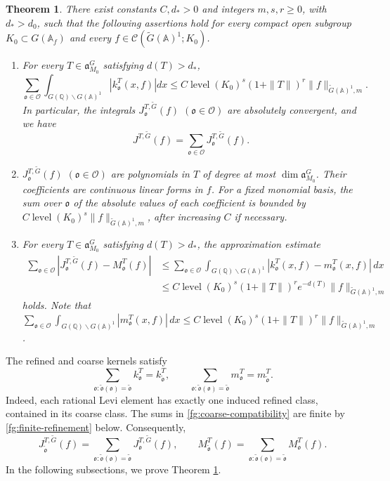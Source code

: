 \documentclass[12pt]{amsart}
\theoremstyle{definition}
\theoremstyle{plain}
\newtheorem{theorem}[definition]{Theorem}
\theoremstyle{remark}
\def\Q{\mathbb{Q}}%
\def\A{\mathbb{A}}%
\def\bs{\backslash}%
\newcommand{\fa}{\mathfrak{a}}
\newcommand{\fo}{\mathfrak{o}}
\newcommand{\cC}{\mathcal{C}}
\newcommand{\cO}{\mathcal{O}}
\numberwithin{equation}{section}
\newcommand{\tG}{\widetilde{G}}
\newcommand{\tfo}{\widetilde{\mathfrak{o}}}
\newcommand{\level}{\operatorname{level}}
\begin{document}
\begin{theorem}\label{thm:main theorem 2}
There exist constants $C,d_*>0$ and integers $m,s,r\ge0$,
with $d_*>d_0$, such that the following assertions hold for
every compact open subgroup $K_0\subset G(\A_f)$ and every
$f\in\cC(\tG(\A)^1;K_0)$.
\begin{enumerate}[(1)]
\item For every $T\in\fa_{M_0}^G$ satisfying $d(T)>d_*$,
\begin{equation*}
 \sum_{\fo\in\cO}\int_{G(\Q)\bs G(\A)^1}
     |k_\fo^T(x,f)|dx
 \le C\level(K_0)^s
          (1+\|T\|)^r\|f\|_{\tG(\A)^1,m}.
\end{equation*}
In particular, the integrals $J_\fo^{T,\tG}(f)$ $(\fo\in\cO)$ are absolutely convergent, and we have
\[
 J^{T,\tG}(f)=\sum_{\fo\in\cO}J_\fo^{T,\tG}(f).
\]
\item $J_\fo^{T,\tG}(f)$ $(\fo\in\cO)$ are polynomials
in $T$ of degree at most $\dim\fa_{M_0}^G$.
Their coefficients are continuous linear forms in $f$.
For a fixed monomial basis, the sum over $\fo$ of the absolute
values of each coefficient is bounded by
$C\level(K_0)^s\|f\|_{\tG(\A)^1,m}$,
after increasing $C$ if necessary.
\item For every $T\in\fa_{M_0}^G$ satisfying $d(T)>d_*$, the approximation estimate
\begin{align*}
 \sum_{\fo\in\cO}|J_\fo^{T,\tG}(f)-M_\fo^T(f)|
 &\le\sum_{\fo\in\cO}\int_{G(\Q)\bs G(\A)^1}
           |k_\fo^T(x,f)-m_\fo^T(x,f)|\,dx\\
 &\le C\level(K_0)^s
       (1+\|T\|)^r e^{-d(T)}\|f\|_{\tG(\A)^1,m}
\end{align*}
holds. Note that $\sum_{\fo\in\cO}\int_{G(\Q)\bs G(\A)^1}|m_\fo^T(x,f)|\,dx\le C\level(K_0)^s
       (1+\|T\|)^r\|f\|_{\tG(\A)^1,m}$.
\end{enumerate}
\end{theorem}

The refined and coarse kernels satisfy
\begin{equation}\label{fg:coarse-compatibility}
 \sum_{\fo:\tfo(\fo)=\tfo}k_\fo^T=k_{\tfo}^T,
 \qquad
 \sum_{\fo:\tfo(\fo)=\tfo}m_\fo^T=m_{\tfo}^T.
\end{equation}
Indeed, each rational Levi element has exactly one induced
refined class, contained in its coarse class.
The sums in \eqref{fg:coarse-compatibility} are finite by
\eqref{fg:finite-refinement} below. Consequently, 
\[
 J_{\tfo}^{T,\tG}(f)
 =\sum_{\fo:\tfo(\fo)=\tfo}J_\fo^{T,\tG}(f),
 \qquad
 M_{\tfo}^T(f)
 =\sum_{\fo:\tfo(\fo)=\tfo}M_\fo^T(f).
\]
In the following subsections, we prove Theorem \ref{thm:main theorem 2}.
\end{document}

